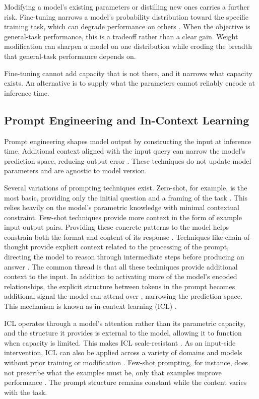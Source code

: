 \documentclass{article}
\begin{document}
Modifying a model's existing parameters or distilling new ones carries a further risk. Fine-tuning narrows a model's probability distribution toward the specific training task, which can degrade performance on others \cite{catastrophic_forgetting2023}. When the objective is general-task performance, this is a tradeoff rather than a clear gain. Weight modification can sharpen a model on one distribution while eroding the breadth that general-task performance depends on.

Fine-tuning cannot add capacity that is not there, and it narrows what capacity exists. An alternative is to supply what the parameters cannot reliably encode at inference time.


\subsection{Prompt Engineering and In-Context Learning}

Prompt engineering shapes model output by constructing the input at inference time. Additional context aligned with the input query can narrow the model's prediction space, reducing output error \cite{whendoescontexthelp2026}. These techniques do not update model parameters and are agnostic to model version.

Several variations of prompting techniques exist. Zero-shot, for example, is the most basic, providing only the initial question and a framing of the task \cite{brown2020gpt3}. This relies heavily on the model's parametric knowledge with minimal contextual constraint. Few-shot techniques provide more context in the form of example input-output pairs. Providing these concrete patterns to the model helps constrain both the format and content of its response \cite{brown2020gpt3, sahoo2024promptsurvey}. Techniques like chain-of-thought provide explicit context related to the processing of the prompt, directing the model to reason through intermediate steps before producing an answer \cite{wei2022cot}. The common thread is that all these techniques provide additional context to the input. In addition to activating more of the model's encoded relationships, the explicit structure between tokens in the prompt becomes additional signal the model can attend over \cite{olsson2022inductionheads}, narrowing the prediction space. This mechanism is known as in-context learning (ICL) \cite{brown2020gpt3}.

ICL operates through a model's attention rather than its parametric capacity, and the structure it provides is external to the model, allowing it to function when capacity is limited. This makes ICL scale-resistant \cite{costofdownscaling2023}. As an input-side intervention, ICL can also be applied across a variety of domains and models without prior training or modification \cite{brown2020gpt3}. Few-shot prompting, for instance, does not prescribe what the examples must be, only that examples improve performance \cite{sahoo2024promptsurvey}. The prompt structure remains constant while the content varies with the task.
\end{document}
